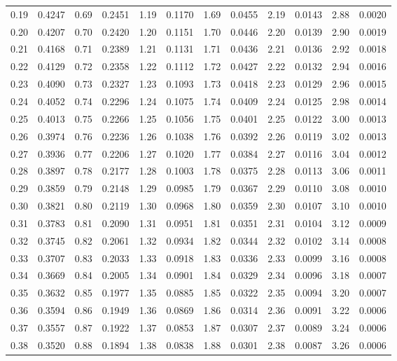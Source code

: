 {\begin{tabular}{|ll|ll|ll|ll|ll|ll|}
 0.19 & 0.4247 & 0.69 & 0.2451& 1.19 & 0.1170& 1.69 & 0.0455& 2.19 & 0.0143&2.88 &0.0020\\
 0.20 & 0.4207 & 0.70 & 0.2420& 1.20 & 0.1151& 1.70 & 0.0446& 2.20 & 0.0139&2.90 &0.0019\\
 0.21 & 0.4168 & 0.71 & 0.2389& 1.21 & 0.1131& 1.71 & 0.0436& 2.21 & 0.0136&2.92 &0.0018\\
 0.22 & 0.4129 & 0.72 & 0.2358& 1.22 & 0.1112& 1.72 & 0.0427& 2.22 & 0.0132&2.94 &0.0016\\
 0.23 & 0.4090 & 0.73 & 0.2327& 1.23 & 0.1093& 1.73 & 0.0418& 2.23 & 0.0129&2.96 &0.0015\\
 0.24 & 0.4052 & 0.74 & 0.2296& 1.24 & 0.1075& 1.74 & 0.0409& 2.24 & 0.0125&2.98 &0.0014\\
 0.25 & 0.4013 & 0.75 & 0.2266& 1.25 & 0.1056& 1.75 & 0.0401& 2.25 & 0.0122&3.00 &0.0013\\
 0.26 & 0.3974 & 0.76 & 0.2236& 1.26 & 0.1038& 1.76 & 0.0392& 2.26 & 0.0119&3.02 &0.0013\\
 0.27 & 0.3936 & 0.77 & 0.2206& 1.27 & 0.1020& 1.77 & 0.0384& 2.27 & 0.0116&3.04 &0.0012\\
 0.28 & 0.3897 & 0.78 & 0.2177& 1.28 & 0.1003& 1.78 & 0.0375& 2.28 & 0.0113&3.06 &0.0011\\
 0.29 & 0.3859 & 0.79 & 0.2148& 1.29 & 0.0985& 1.79 & 0.0367& 2.29 & 0.0110&3.08 &0.0010\\
 0.30 & 0.3821 & 0.80 & 0.2119& 1.30 & 0.0968& 1.80 & 0.0359& 2.30 & 0.0107&3.10 &0.0010\\
 0.31 & 0.3783 & 0.81 & 0.2090& 1.31 & 0.0951& 1.81 & 0.0351& 2.31 & 0.0104&3.12 &0.0009\\
 0.32 & 0.3745 & 0.82 & 0.2061& 1.32 & 0.0934& 1.82 & 0.0344& 2.32 & 0.0102&3.14 &0.0008\\
 0.33 & 0.3707 & 0.83 & 0.2033& 1.33 & 0.0918& 1.83 & 0.0336& 2.33 & 0.0099&3.16 &0.0008\\
 0.34 & 0.3669 & 0.84 & 0.2005& 1.34 & 0.0901& 1.84 & 0.0329& 2.34 & 0.0096&3.18 &0.0007\\
 0.35 & 0.3632 & 0.85 & 0.1977& 1.35 & 0.0885& 1.85 & 0.0322& 2.35 & 0.0094&3.20 &0.0007\\
 0.36 & 0.3594 & 0.86 & 0.1949& 1.36 & 0.0869& 1.86 & 0.0314& 2.36 & 0.0091&3.22 &0.0006\\
 0.37 & 0.3557 & 0.87 & 0.1922& 1.37 & 0.0853& 1.87 & 0.0307& 2.37 & 0.0089&3.24 &0.0006\\
 0.38 & 0.3520 & 0.88 & 0.1894& 1.38 & 0.0838& 1.88 & 0.0301& 2.38 & 0.0087&3.26 &0.0006\\

\end{tabular}}

